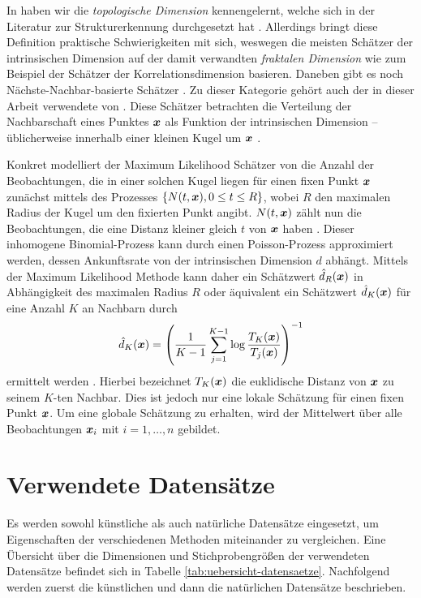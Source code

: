 In  haben wir die \textit{topologische
	Dimension} kennengelernt, welche sich in der Literatur zur Strukturerkennung durchgesetzt hat \parencite[1]{Campadelli.2015}. Allerdings bringt diese Definition praktische Schwierigkeiten mit sich,
weswegen die meisten Schätzer der intrinsischen Dimension auf der damit verwandten
\textit{fraktalen Dimension} wie zum Beispiel der Schätzer der Korrelationsdimension \parencite{Camastra.2002} basieren. Daneben gibt es noch Nächste-Nachbar-basierte Schätzer \parencite[1]{Campadelli.2015}. Zu dieser Kategorie gehört auch der in dieser Arbeit verwendete
 von \textcite{Levina.2004}. Diese Schätzer betrachten die
Verteilung der Nachbarschaft eines Punktes $\bm{x}$ als Funktion der intrinsischen Dimension --
üblicherweise innerhalb einer kleinen Kugel um $\bm{x}$
\parencite[8]{Campadelli.2015}.

Konkret modelliert der Maximum Likelihood Schätzer von \textcite{Levina.2004} die Anzahl der
Beobachtungen, die in einer solchen Kugel liegen für einen fixen Punkt $\bm{x}$ zunächst mittels
des Prozesses $\{ N(t, \bm{x}), 0 \leq t \leq R \}$, wobei $R$ den maximalen Radius der Kugel um
den fixierten Punkt angibt. $N(t, \bm{x})$ zählt nun die Beobachtungen, die eine Distanz kleiner
gleich $t$ von $\bm{x}$ haben \parencite[3]{Levina.2004}. Dieser inhomogene Binomial-Prozess kann durch einen Poisson-Prozess
approximiert werden, dessen Ankunftsrate von der intrinsischen Dimension $d$ abhängt. Mittels der
Maximum Likelihood Methode kann daher ein Schätzwert $\hat{d}_R(\bm{x})$ in Abhängigkeit
des maximalen Radius $R$ oder äquivalent ein Schätzwert $\hat{d}_K(\bm{x})$ für eine Anzahl
$K$ an Nachbarn durch
\begin{equation}
	\hat{d}_K(\bm{x}) = \left( \frac{1}{K - 1} \sum_{j=1}^{K - 1} \log \frac{T_K(\bm{x})}{T_j(\bm{x})} \right)^{-1}
\end{equation}
ermittelt werden \parencite[3 -- 4]{Levina.2004}. Hierbei bezeichnet $T_{K}(\bm{x})$ die euklidische Distanz von
$\bm{x}$ zu seinem $K$-ten Nachbar. Dies ist jedoch nur eine lokale Schätzung für einen fixen
Punkt $\bm{x}$. Um eine globale Schätzung zu erhalten, wird der Mittelwert über alle
Beobachtungen $\bm{x}_i$ mit $i = 1, \ldots, n$ gebildet.
\section{Verwendete Datensätze}
\label{ch:Vergleich:sec:VerwendeteDatensaetze}
Es werden sowohl künstliche als auch natürliche Datensätze eingesetzt, um Eigenschaften der
verschiedenen Methoden miteinander zu vergleichen. Eine Übersicht über die Dimensionen und Stichprobengrößen der verwendeten Datensätze befindet sich in Tabelle \ref{tab:uebersicht-datensaetze}. Nachfolgend werden zuerst die künstlichen und dann die natürlichen Datensätze beschrieben.

